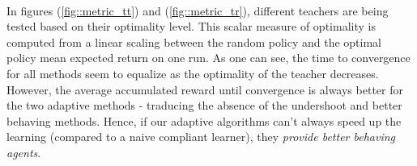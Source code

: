 \documentclass[a4paper]{report}
\begin{document}
{{{{				\paragraph{} In figures (\ref{fig::metric_tt}) and (\ref{fig::metric_tr}), different teachers are being tested based on their optimality level. This scalar measure of optimality is computed from a linear scaling between the random policy and the optimal policy mean expected return on one run. As one can see, the time to convergence for all methods seem to equalize as the optimality of the teacher decreases. However, the average accumulated reward until convergence is always better for the two adaptive methods - traducing the absence of the undershoot and better behaving methods. Hence, if our adaptive algorithms can't always speed up the learning (compared to a naive compliant learner), they \emph{provide better behaving agents}. 
				
}}}}
\end{document}
